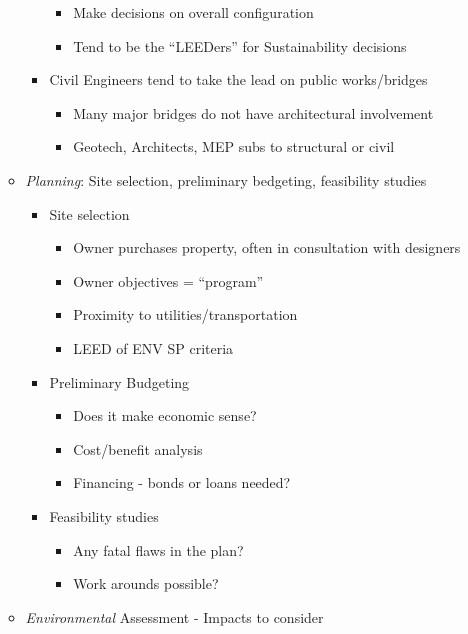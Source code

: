 \documentclass{article}
\begin{document}
\begin{itemize}
\begin{itemize}
\begin{itemize}
\begin{itemize}
                \item Make decisions on overall configuration
                \item Tend to be the ``LEEDers'' for Sustainability decisions
            \end{itemize}
            \item Civil Engineers tend to take the lead on public works/bridges
            \begin{itemize}
                \item Many major bridges do not have architectural involvement
                \item Geotech, Architects, MEP subs to structural or civil
            \end{itemize}
        \end{itemize}
        \item \textit{Planning}: Site selection, preliminary bedgeting, feasibility studies
        \begin{itemize}
            \item Site selection
            \begin{itemize}
                \item Owner purchases property, often in consultation with designers
                \item Owner objectives = ``program''
                \item Proximity to utilities/transportation
                \item LEED of ENV SP criteria
            \end{itemize}
            \item Preliminary Budgeting
            \begin{itemize}
                \item Does it make economic sense?
                \item Cost/benefit analysis
                \item Financing - bonds or loans needed?
            \end{itemize}
            \item Feasibility studies
            \begin{itemize}
                \item Any fatal flaws in the plan?
                \item Work arounds possible?
            \end{itemize}
        \end{itemize}
        \item \textit{Environmental} Assessment - Impacts to consider

\end{itemize}
\end{itemize}
\end{document}
